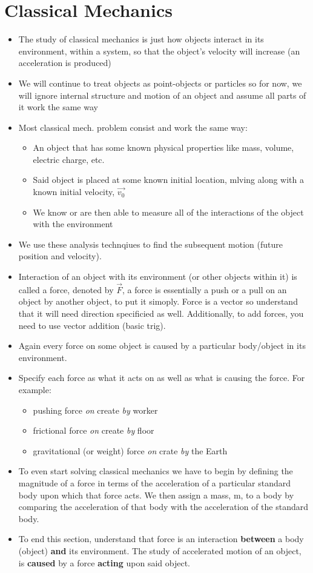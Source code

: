 \documentclass[openany]{book}
\begin{document}
\section{Classical Mechanics}
    \begin{itemize}
    \item The study of classical mechanics is just how objects interact in its environment, within a system, so that the object's velocity will increase (an acceleration is produced)
    \item We will continue to treat objects as point-objects or particles so for now, we will ignore internal structure and motion of an object and assume all parts of it work the same way
    \item Most classical mech. problem consist and work the same way:
    \begin{itemize}
        \item An object that has some known physical properties like mass, volume, electric charge, etc.
        \item Said object is placed at some known initial location, mlving along with a known initial velocity, $\vec{v_0}$
        \item We know or are then able to measure all of the interactions of the object with the environment
    \end{itemize}
    \item We use these analysis technqiues to find the subsequent motion (future position and velocity).
    \item Interaction of an object with its environment (or other objects within it) is called a force, denoted by $\vec{F}$, a force is essentially a push or a pull on an object by another object, to put it simoply. Force is a vector so understand that it will need direction specificied as well. Additionally, to add forces, you need to use vector addition (basic trig).
    \item Again every force on some object is caused by a particular body/object in its environment.
    \item Specify each force as what it acts on as well as what is causing the force. For example:
    \begin{itemize}
        \item pushing force \textit{on} create \textit{by} worker
        \item frictional force \textit{on} create \textit{by} floor
        \item gravitational (or weight) force \textit{on} crate \textit{by} the Earth
    \end{itemize}
    \item To even start solving classical mechanics we have to begin by defining the magnitude of a force in terms of the acceleration of a particular standard body upon which that force acts. We then assign a mass, m, to a body by comparing the acceleration of that body with the acceleration of the standard body.
    \item To end this section, understand that force is an interaction {\bfseries{between}} a body (object) {\bfseries{and}} its environment. The study of accelerated motion of an object, is {\bfseries{caused}} by a force {\bfseries{acting}} upon said object.
    \end{itemize}
\end{document}
